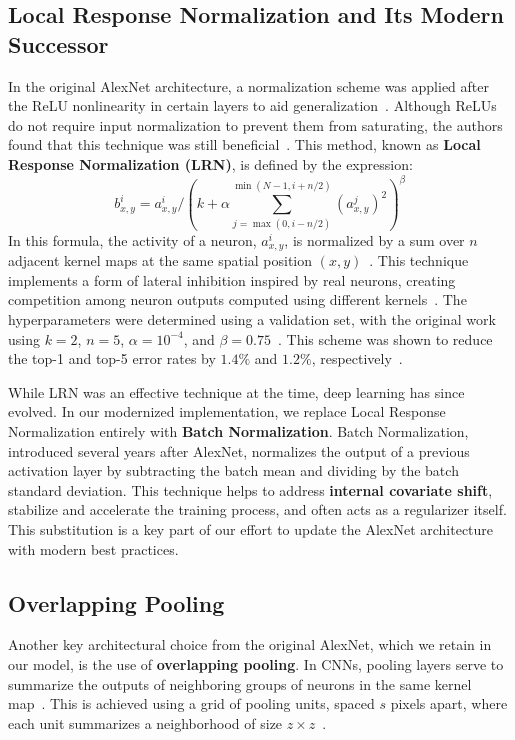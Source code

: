 \documentclass{article}
\begin{document}
\subsection{Local Response Normalization and Its Modern Successor}
\noindent
In the original AlexNet architecture, a normalization scheme was applied after the ReLU nonlinearity in certain layers to aid generalization~\cite{krizhevsky2012imagenet}. Although ReLUs do not require input normalization to prevent them from saturating, the authors found that this technique was still beneficial~\cite{krizhevsky2012imagenet}. This method, known as \textbf{Local Response Normalization (LRN)}, is defined by the expression:
$$
b_{x,y}^{i} = a_{x,y}^{i} / \left(k + \alpha \sum_{j=\max(0, i-n/2)}^{\min(N-1, i+n/2)} (a_{x,y}^{j})^2\right)^\beta
$$
In this formula, the activity of a neuron, $a_{x,y}^{i}$, is normalized by a sum over $n$ adjacent kernel maps at the same spatial position $(x,y)$~\cite{krizhevsky2012imagenet}. This technique implements a form of lateral inhibition inspired by real neurons, creating competition among neuron outputs computed using different kernels~\cite{krizhevsky2012imagenet}. The hyperparameters were determined using a validation set, with the original work using $k=2$, $n=5$, $\alpha=10^{-4}$, and $\beta=0.75$~\cite{krizhevsky2012imagenet}. This scheme was shown to reduce the top-1 and top-5 error rates by $1.4\%$ and $1.2\%$, respectively~\cite{krizhevsky2012imagenet}.

While LRN was an effective technique at the time, deep learning has since evolved. In our modernized implementation, we replace Local Response Normalization entirely with \textbf{Batch Normalization}. Batch Normalization, introduced several years after AlexNet, normalizes the output of a previous activation layer by subtracting the batch mean and dividing by the batch standard deviation. This technique helps to address \textbf{internal covariate shift}, stabilize and accelerate the training process, and often acts as a regularizer itself. This substitution is a key part of our effort to update the AlexNet architecture with modern best practices.

\subsection{Overlapping Pooling}
\noindent
Another key architectural choice from the original AlexNet, which we retain in our model, is the use of \textbf{overlapping pooling}. In CNNs, pooling layers serve to summarize the outputs of neighboring groups of neurons in the same kernel map~\cite{krizhevsky2012imagenet}. This is achieved using a grid of pooling units, spaced $s$ pixels apart, where each unit summarizes a neighborhood of size $z \times z$~\cite{krizhevsky2012imagenet}.
\end{document}

